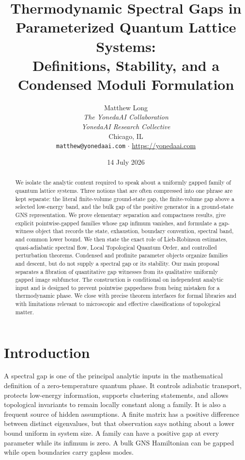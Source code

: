 \documentclass[12pt]{article}
\title{Thermodynamic Spectral Gaps in Parameterized Quantum Lattice Systems:\\
Definitions, Stability, and a Condensed Moduli Formulation}
\author{Matthew Long\\
\textit{The YonedaAI Collaboration}\\
\textit{YonedaAI Research Collective}\\
Chicago, IL\\
\texttt{matthew@yonedaai.com} $\cdot$ \url{https://yonedaai.com}}
\date{14 July 2026}
\theoremstyle{definition}
\theoremstyle{remark}
\begin{document}
\maketitle

\begin{abstract}
We isolate the analytic content required to speak about a uniformly gapped
family of quantum lattice systems. Three notions that are often compressed
into one phrase are kept separate: the literal finite-volume ground-state
gap, the finite-volume gap above a selected low-energy band, and the bulk gap
of the positive generator in a ground-state GNS representation. We prove
elementary separation and compactness results, give explicit pointwise-gapped
families whose gap infimum vanishes, and formulate a gap-witness object that
records the state, exhaustion, boundary convention, spectral band, and common
lower bound. We then state the exact role of Lieb-Robinson estimates,
quasi-adiabatic spectral flow, Local Topological Quantum Order, and controlled
perturbation theorems. Condensed and profinite parameter objects organize
families and descent, but do not supply a spectral gap or its stability. Our
main proposal separates a fibration of quantitative gap witnesses from its
qualitative uniformly gapped image subfunctor. The construction is conditional on independent
analytic input and is designed to prevent pointwise gappedness from being
mistaken for a thermodynamic phase. We close with precise theorem interfaces
for formal libraries and with limitations relevant to microscopic and
effective classifications of topological matter.
\end{abstract}

\tableofcontents

\section{Introduction}

A spectral gap is one of the principal analytic inputs in the mathematical
definition of a zero-temperature quantum phase. It controls adiabatic
transport, protects low-energy information, supports clustering statements,
and allows topological invariants to remain locally constant along a family.
It is also a frequent source of hidden assumptions. A finite matrix has a
positive difference between distinct eigenvalues, but that observation says
nothing about a lower bound uniform in system size. A family can have a
positive gap at every parameter while its infimum is zero. A bulk GNS
Hamiltonian can be gapped while open boundaries carry gapless modes.
\end{document}
